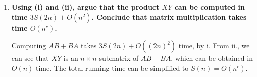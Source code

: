 \documentclass[a4paper,12pt]{article}
\begin{document}
\begin{enumerate}
\begin{enumerate}
\begin{enumerate}
\begin{align*}
\begin{array}{cc}
                                        0 & 0 \\
                                        0 & 0
                                \end{array} \right]
                                +
                                \left[ \begin{array}{cc}
                                        X^2 & XY \\
                                        0 & 0
                                \end{array} \right] \\
                                &=
                                \left[ \begin{array}{cc}
                                        2X^2 & XY \\
                                        0 & 0
                                \end{array} \right].
                            \end{align*}
                        \item
                            \boldmath\textbf{Using (i) and (ii), argue that the product $XY$ can be computed in time $3S(2n) + O(n^2)$. Conclude that matrix multiplication takes time $O(n^c)$.
                            }\unboldmath \par
                            Computing $AB + BA$ takes $3S(2n) + O((2n)^2)$ time, by i. From ii., we can see that $XY$ is an $n \times n$ submatrix of $AB + BA$, which can be obtained in $O(n)$ time. The total running time can be simplified to $S(n) = O(n^c)$.
                    \end{enumerate}
            \end{enumerate}


\end{enumerate}
\end{document}
